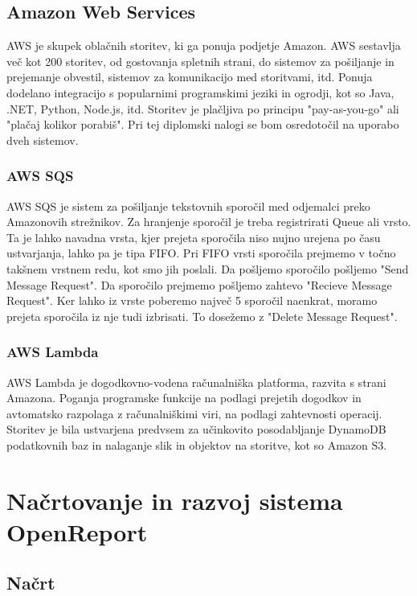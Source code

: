 \documentclass[a4paper, 12pt]{book}
\begin{document}
\section{Amazon Web Services}

AWS je skupek oblačnih storitev, ki ga ponuja podjetje Amazon.
AWS sestavlja več kot 200 storitev, od gostovanja spletnih strani, do sistemov za pošiljanje in prejemanje obvestil, sistemov za komunikacijo med storitvami, itd.
Ponuja dodelano integracijo s popularnimi programskimi jeziki in ogrodji, kot so Java, .NET, Python, Node.js, itd.
Storitev je plačljiva po principu "pay-as-you-go" ali "plačaj kolikor porabiš".
Pri tej diplomski nalogi se bom osredotočil na uporabo dveh sistemov.

\subsection{AWS SQS}

AWS SQS je sistem za pošiljanje tekstovnih sporočil med odjemalci preko Amazonovih strežnikov.
Za hranjenje sporočil je treba registrirati Queue ali vrsto. 
Ta je lahko navadna vrsta, kjer prejeta sporočila niso nujno urejena po času ustvarjanja, lahko pa je tipa FIFO.
Pri FIFO vrsti sporočila prejmemo v točno takšnem vrstnem redu, kot smo jih poslali.
Da pošljemo sporočilo pošljemo "Send Message Request".
Da sporočilo prejmemo pošljemo zahtevo "Recieve Message Request".
Ker lahko iz vrste poberemo največ 5 sporočil naenkrat, moramo prejeta sporočila iz nje tudi izbrisati.
To dosežemo z "Delete Message Request".

\subsection{AWS Lambda}

AWS Lambda je dogodkovno-vodena računalniška platforma, razvita s strani Amazona.
Poganja programske funkcije na podlagi prejetih dogodkov in avtomatsko razpolaga z računalniškimi viri, na podlagi zahtevnosti operacij.
Storitev je bila ustvarjena predvsem za učinkovito posodabljanje DynamoDB podatkovnih baz in nalaganje slik in objektov na storitve, kot so Amazon S3.


\chapter{Načrtovanje in razvoj sistema OpenReport}


\section{Načrt}
\end{document}

